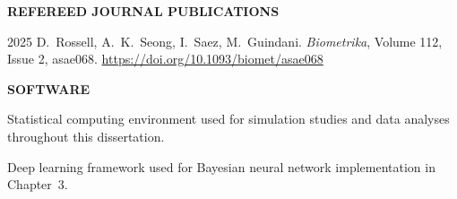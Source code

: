 {\pagebreak

\textbf{REFEREED JOURNAL PUBLICATIONS}

  {2025}
  {D.\ Rossell, A.\ K.\ Seong, I.\ Saez, M.\ Guindani.
   \emph{Biometrika}, Volume 112, Issue 2, asae068.
   \url{https://doi.org/10.1093/biomet/asae068}}

\vspace{12pt}
\textbf{SOFTWARE}

  {Statistical computing environment used for simulation studies and
   data analyses throughout this dissertation.}

  {Deep learning framework used for Bayesian neural network
   implementation in Chapter~3.}

}

